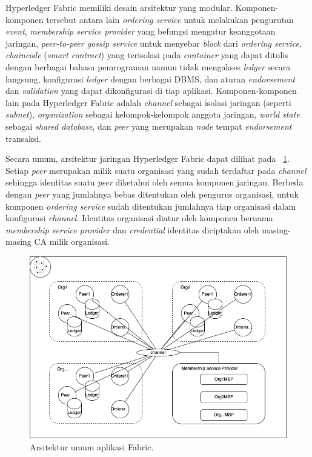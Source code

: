 Hyperledger Fabric memiliki desain arsitektur yang modular. Komponen-komponen tersebut antara lain \textit{ordering service} untuk melakukan pengurutan \textit{event}, \textit{membership service provider} yang befungsi mengatur keanggotaan jaringan, \textit{peer-to-peer gossip service} untuk menyebar \textit{block} dari \textit{ordering service}, \textit{chaincode} (\textit{smart contract}) yang terisolasi pada \textit{container} yang dapat ditulis dengan berbagai bahasa pemrograman namun tidak mengakses \textit{ledger} secara langsung, konfigurasi \textit{ledger} dengan berbagai DBMS, dan aturan \textit{endorsement} dan \textit{validation} yang dapat dikonfigurasi di tiap aplikasi. Komponen-komponen lain pada Hyperledger Fabric adalah \textit{channel} sebagai isolasi jaringan (seperti \textit{subnet}), \textit{organization} sebagai kelompok-kelompok anggota jaringan, \textit{world state} sebagai \textit{shared database}, dan \textit{peer} yang merupakan \textit{node} tempat \textit{endorsement} transaksi.


Secara umum, arsitektur jaringan Hyperledger Fabric dapat dilihat pada \pic~\ref{fig:fabric_arch}. Setiap \textit{peer} merupakan milik suatu organisasi yang sudah terdaftar pada \textit{channel} sehingga identitas suatu \textit{peer} diketahui oleh semua komponen jaringan. Berbeda dengan \textit{peer} yang jumlahnya bebas ditentukan oleh pengurus organisasi, untuk komponen \textit{ordering service} sudah ditentukan jumlahnya tiap organisasi dalam konfigurasi \textit{channel}. Identitas organisasi diatur oleh komponen bernama \textit{membership service provider} dan \textit{credential} identitas diciptakan oleh masing-masing CA milik organisasi.


\begin{figure}
	\centering
	\includegraphics[width=\textwidth]{assets/pics/fabric_arch}
	\caption{Arsitektur umum aplikasi Fabric.}
	\label{fig:fabric_arch}
\end{figure}

